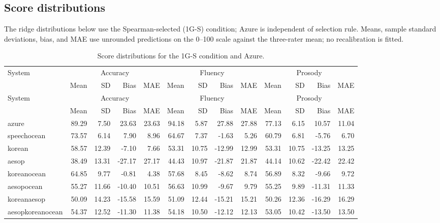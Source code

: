 \documentclass[10pt]{article}
\begin{document}
\begin{landscape}
\begingroup\small\setlength{\tabcolsep}{4pt}\setlength{\LTcapwidth}{\linewidth}
\subsection{Score distributions}
The ridge distributions below use the Spearman-selected (1G-S) condition; Azure is independent of selection rule. Means, sample standard deviations, bias, and MAE use unrounded predictions on the 0--100 scale against the three-rater mean; no recalibration is fitted.
\begin{longtable}{@{}lrrrrrrrrrrrr@{}}
\caption{Score distributions for the 1G-S condition and Azure.}\\
\toprule
System & \multicolumn{4}{c}{Accuracy} & \multicolumn{4}{c}{Fluency} & \multicolumn{4}{c}{Prosody}\\
 & Mean & SD & Bias & MAE & Mean & SD & Bias & MAE & Mean & SD & Bias & MAE\\\midrule
\endfirsthead
\toprule
System & \multicolumn{4}{c}{Accuracy} & \multicolumn{4}{c}{Fluency} & \multicolumn{4}{c}{Prosody}\\
 & Mean & SD & Bias & MAE & Mean & SD & Bias & MAE & Mean & SD & Bias & MAE\\\midrule
\endhead
\bottomrule\endfoot
azure & 89.29 & 7.50 & 23.63 & 23.63 & 94.18 & 5.87 & 27.88 & 27.88 & 77.13 & 6.15 & 10.57 & 11.04\\
speechocean & 73.57 & 6.14 & 7.90 & 8.96 & 64.67 & 7.37 & -1.63 & 5.26 & 60.79 & 6.81 & -5.76 & 6.70\\
korean & 58.57 & 12.39 & -7.10 & 7.66 & 53.31 & 10.75 & -12.99 & 12.99 & 53.31 & 10.75 & -13.25 & 13.25\\
aesop & 38.49 & 13.31 & -27.17 & 27.17 & 44.43 & 10.97 & -21.87 & 21.87 & 44.14 & 10.62 & -22.42 & 22.42\\
koreanocean & 64.85 & 9.77 & -0.81 & 4.38 & 57.68 & 8.45 & -8.62 & 8.74 & 56.89 & 8.32 & -9.66 & 9.72\\
aesopocean & 55.27 & 11.66 & -10.40 & 10.51 & 56.63 & 10.99 & -9.67 & 9.79 & 55.25 & 9.89 & -11.31 & 11.33\\
koreanaesop & 50.09 & 14.23 & -15.58 & 15.59 & 51.09 & 12.44 & -15.21 & 15.21 & 50.26 & 12.36 & -16.29 & 16.29\\
aesopkoreanocean & 54.37 & 12.52 & -11.30 & 11.38 & 54.18 & 10.50 & -12.12 & 12.13 & 53.05 & 10.42 & -13.50 & 13.50\\
\end{longtable}

\end{landscape}
\end{document}
